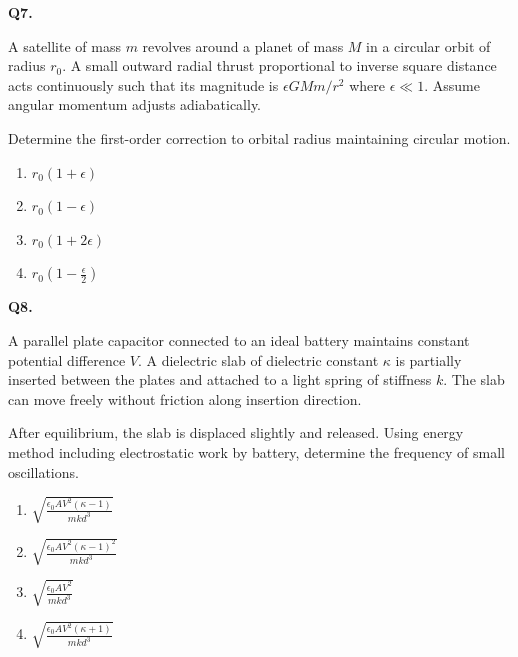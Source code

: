 \documentclass[12pt]{article}
\begin{document}

\textbf{Q7.}

A satellite of mass $m$ revolves around a planet of mass $M$ in a circular orbit of radius $r_0$. A small outward radial thrust proportional to inverse square distance acts continuously such that its magnitude is $ \epsilon GMm/r^2 $ where $ \epsilon \ll 1 $. Assume angular momentum adjusts adiabatically.

Determine the first-order correction to orbital radius maintaining circular motion.

\begin{enumerate}
\item[(A)] $r_0(1+\epsilon)$
\item[(B)] $r_0(1-\epsilon)$
\item[(C)] $r_0(1+2\epsilon)$
\item[(D)] $r_0(1-\frac{\epsilon}{2})$
\end{enumerate}


\textbf{Q8.}

A parallel plate capacitor connected to an ideal battery maintains constant potential difference $V$. A dielectric slab of dielectric constant $\kappa$ is partially inserted between the plates and attached to a light spring of stiffness $k$. The slab can move freely without friction along insertion direction.

After equilibrium, the slab is displaced slightly and released. Using energy method including electrostatic work by battery, determine the frequency of small oscillations.

\begin{center}
\end{center}

\begin{enumerate}
\item[(A)] $\sqrt{\frac{\epsilon_0AV^2(\kappa-1)}{mkd^3}}$
\item[(B)] $\sqrt{\frac{\epsilon_0AV^2(\kappa-1)^2}{mkd^3}}$
\item[(C)] $\sqrt{\frac{\epsilon_0AV^2}{mkd^3}}$
\item[(D)] $\sqrt{\frac{\epsilon_0AV^2(\kappa+1)}{mkd^3}}$
\end{enumerate}
\end{document}
